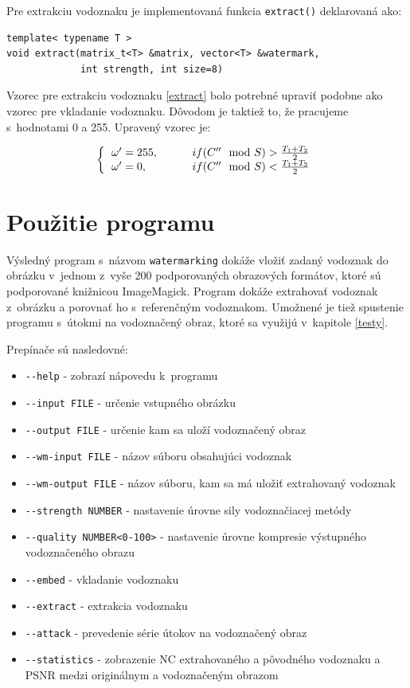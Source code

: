 Pre extrakciu vodoznaku je implementovaná funkcia {\tt extract()} deklarovaná ako:
\begin{lstlisting}
template< typename T >
void extract(matrix_t<T> &matrix, vector<T> &watermark,
             int strength, int size=8)
\end{lstlisting}

Vzorec pre extrakciu vodoznaku \ref{extract} bolo potrebné upraviť podobne ako vzorec pre vkladanie vodoznaku. Dôvodom je taktiež to, že pracujeme s~hodnotami 0 a 255. Upravený vzorec je:

\begin{equation} \label{extract-mod}
\left \{
  \begin{tabular}{ll}
  $\omega' = 255,\qquad$ & $if (C''\mod S) > \frac{T_1+T_2}{2}$ \\
  $\omega' = 0,\qquad$  & $if (C''\mod S) < \frac{T_1+T_2}{2}$
  \end{tabular}
\right.
\end{equation}

\section{Použitie programu}
\label{impl:help}
Výsledný program s~názvom {\tt watermarking} dokáže vložiť zadaný vodoznak do obrázku v~jednom z~vyše 200 podporovaných obrazových formátov, ktoré sú podporované knižnicou ImageMagick. Program dokáže extrahovať vodoznak z~obrázku a porovnať ho s~referenčným vodoznakom. Umožnené je tiež spustenie programu s~útokmi na vodoznačený obraz, ktoré sa využijú v~kapitole \ref{testy}.

Prepínače sú nasledovné:
\begin{itemize}
\item {\verb|--help|} - zobrazí nápovedu k~programu
\item {\verb|--input FILE|} - určenie vstupného obrázku
\item {\verb|--output FILE|} - určenie kam sa uloží vodoznačený obraz
\item {\verb|--wm-input FILE|} - názov súboru obsahujúci vodoznak
\item {\verb|--wm-output FILE|} - názov súboru, kam sa má uložiť extrahovaný vodoznak
\item {\verb|--strength NUMBER|} - nastavenie úrovne sily vodoznačiacej metódy
\item {\verb|--quality NUMBER<0-100>|} - nastavenie úrovne kompresie výstupného vodoznačeného obrazu
\item {\verb|--embed|} - vkladanie vodoznaku
\item {\verb|--extract|} - extrakcia vodoznaku
\item {\verb|--attack|} - prevedenie série útokov na vodoznačený obraz
\item {\verb|--statistics|} - zobrazenie NC extrahovaného a pôvodného vodoznaku a PSNR medzi originálnym a vodoznačeným obrazom 
\end{itemize}


